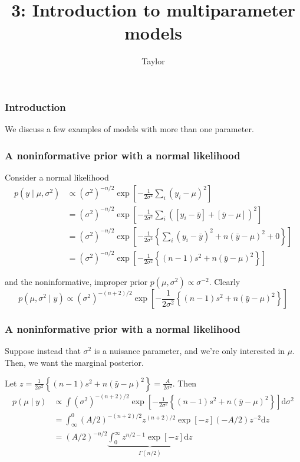 \documentclass{beamer}
\title["3"]{3: Introduction to multiparameter models}
\author{Taylor}
\institute[UVA] 
{
University of Virginia \\
\medskip
\textit{} 
}
\date{}
\begin{document}

\begin{frame}
\titlepage 
\end{frame}

\begin{frame}
\frametitle{Introduction}

We discuss a few examples of models with more than one parameter.


\end{frame}


\begin{frame}
\frametitle{A noninformative prior with a normal likelihood}

Consider a normal likelihood
\begin{align*}
p(y \mid \mu, \sigma^2) &\propto (\sigma^2)^{-n/2}\exp\left[ - \frac{1}{2\sigma^2} \sum_i(y_i- \mu)^2 \right] \\
&= (\sigma^2)^{-n/2}\exp\left[ - \frac{1}{2\sigma^2} \sum_i([y_i- \bar{y}] + [\bar{y} - \mu])^2 \right] \\
&= (\sigma^2)^{-n/2}\exp\left[ - \frac{1}{2\sigma^2} \left\{ \sum_i(y_i- \bar{y})^2 + n(\bar{y} - \mu)^2 + 0 \right\} \right] \\
&= (\sigma^2)^{-n/2} \exp\left[ - \frac{1}{2\sigma^2}\left\{(n-1)  s^2 + n(\bar{y} - \mu)^2 \right\} \right]
\end{align*}

and the noninformative, improper prior $p(\mu, \sigma^2) \propto \sigma^{-2}$. Clearly 
\[
p(\mu, \sigma^2 \mid y) \propto (\sigma^2)^{-(n+2)/2}\exp\left[ - \frac{1}{2\sigma^2}\left\{(n-1)  s^2 + n(\bar{y} - \mu)^2 \right\} \right]
\]

\end{frame}
\begin{frame}
\frametitle{A noninformative prior with a normal likelihood}

Suppose instead that $\sigma^2$ is a nuisance parameter, and we're only interested in $\mu$. Then, we want the marginal posterior.
\newline

Let $z = \frac{1}{2\sigma^2}\left\{(n-1)  s^2 + n(\bar{y} - \mu)^2 \right\} = \frac{A}{2\sigma^2}$. Then
\begin{align*}
p(\mu \mid y) &\propto \int (\sigma^2)^{-(n+2)/2} \exp\left[ - \frac{1}{2\sigma^2}\left\{(n-1)  s^2 + n(\bar{y} - \mu)^2 \right\} \right] \text{d} \sigma^2 \\
&= \int_{\infty}^0 (A/2)^{-(n+2)/2}z^{(n+2)/2} \exp\left[ - z \right] (-A/2)z^{-2}\text{d} z \\
&= (A/2)^{-n/2} \underbrace{\int^{\infty}_0 z^{n/2-1} \exp\left[ - z \right] \text{d} z}_{\Gamma(n/2)} \\
\end{align*}


\end{frame}
\end{document}
